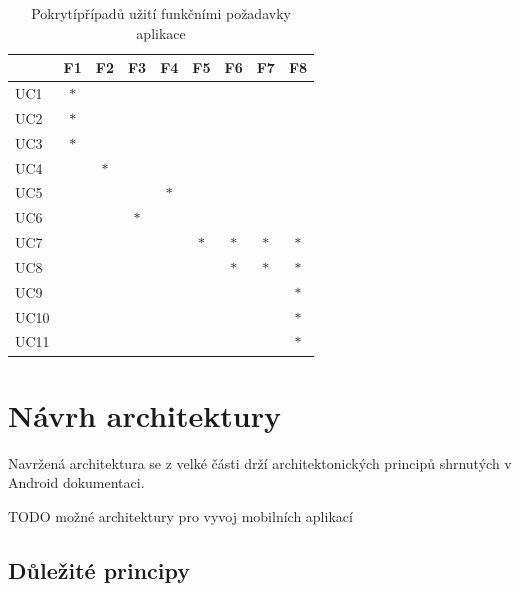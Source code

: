 \begin{table}[H]
  \centering
  \begin{tabular}{|l|c|c|c|c|c|c|c|c|}
  \hline
   & F1 & F2 & F3 & F4 & F5 & F6 & F7 & F8  \\ \hline
  UC1  & $\ast$ &        &        &        &        &        &        &         \\ \hline
  UC2  & $\ast$ &        &        &        &        &        &        &         \\ \hline
  UC3  & $\ast$ &        &        &        &        &        &        &         \\ \hline
  UC4  &        & $\ast$ &        &        &        &        &        &         \\ \hline
  UC5  &        &        &        & $\ast$ &        &        &        &         \\ \hline
  UC6  &        &        & $\ast$ &        &        &        &        &         \\ \hline
  UC7  &        &        &        &        & $\ast$ & $\ast$ & $\ast$ & $\ast$  \\ \hline
  UC8  &        &        &        &        &        & $\ast$ & $\ast$ & $\ast$  \\ \hline
  UC9  &        &        &        &        &        &        &        & $\ast$  \\ \hline
  UC10 &        &        &        &        &        &        &        & $\ast$  \\ \hline
  UC11 &        &        &        &        &        &        &        & $\ast$  \\ \hline
  \end{tabular}
  \caption{Pokrytípřípadů užití funkčními požadavky aplikace}
  \label{table:tabulkaPokryti}
\end{table}
  

\section{Návrh architektury}
Navržená architektura se z velké části drží architektonických principů shrnutých v Android dokumentaci. \cite{andDocArch}

TODO možné architektury pro vyvoj mobilních aplikací

\subsection*{Důležité principy}

